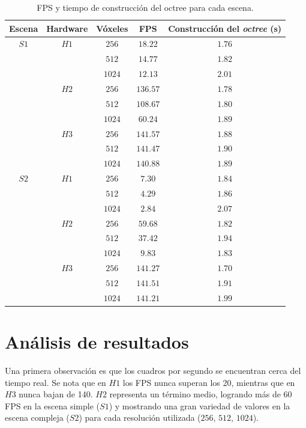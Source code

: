 \begin{table}[ht]
\centering
\begin{tabular}{|c|c|c|c|c|}
	\hline
	\textbf{Escena} & \textbf{Hardware} & \textbf{Vóxeles} & \textbf{FPS} & \textbf{Construcción del \textit{octree} (s)} \\
	\hline
	$S1$ & $H1$ & $256$ & $18.22$ & $1.76$ \\
	\cline{3-5}
	 & & $512$ & $14.77$ & $1.82$ \\
	\cline{3-5}
	 & & $1024$ & $12.13$ & $2.01$ \\
	\cline{2-5}
	 & $H2$ & $256$ & $136.57$ & $1.78$ \\
	\cline{3-5}
	 & & $512$ & $108.67$ & $1.80$ \\
	\cline{3-5}
	 & & $1024$ & $60.24$ & $1.89$ \\
	\cline{2-5}
	 & $H3$ & $256$ & $141.57$ & $1.88$ \\
	\cline{3-5}
	 & & $512$ & $141.47$ & $1.90$ \\
	\cline{3-5}
	 & & $1024$ & $140.88$ & $1.89$ \\
	\hline
	$S2$ & $H1$ & $256$ & $7.30$ & $1.84$ \\
	\cline{3-5}
	 & & $512$ & $4.29$ & $1.86$ \\
	\cline{3-5}
	 & & $1024$ & $2.84$ & $2.07$ \\
	\cline{2-5}
	 & $H2$ & $256$ & $59.68$ & $1.82$ \\
	\cline{3-5}
	 & & $512$ & $37.42$ & $1.94$ \\
	\cline{3-5}
	 & & $1024$ & $9.83$ & $1.83$ \\
	\cline{2-5}
	 & $H3$ & $256$ & $141.27$ & $1.70$ \\
	\cline{3-5}
	 & & $512$ & $141.51$ & $1.91$ \\
	\cline{3-5}
	 & & $1024$ & $141.21$ & $1.99$ \\
	\hline
\end{tabular}
\caption{FPS y tiempo de construcción del octree para cada escena.}
\label{tab:experiment-results}
\end{table}

\section{Análisis de resultados}

Una primera observación es que los cuadros por segundo se encuentran cerca del tiempo real.
Se nota que en $H1$ los FPS nunca superan los 20, mientras que en $H3$ nunca bajan de 140.
$H2$ representa un término medio, logrando más de 60 FPS en la escena simple ($S1$) y mostrando una gran variedad de valores en la escena compleja ($S2$) para cada resolución utilizada ($256$, $512$, $1024$).

